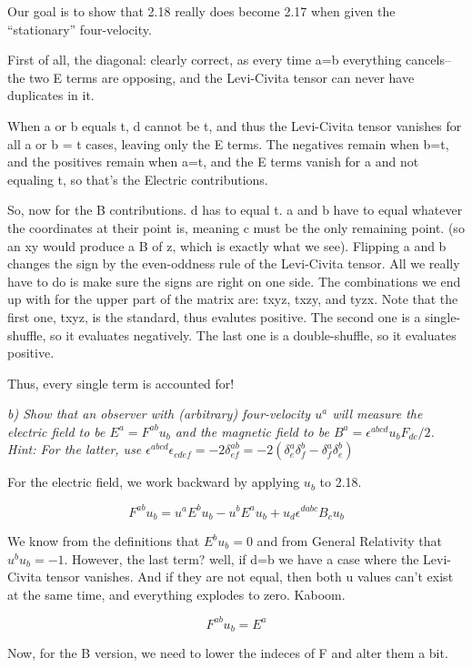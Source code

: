 \documentclass[landscape,letterpaper,10pt,english]{article}
\begin{document}
Our goal is to show that 2.18 really does become 2.17 when given the
``stationary'' four-velocity.

    First of all, the diagonal: clearly correct, as every time a=b
everything cancels--the two E terms are opposing, and the Levi-Civita
tensor can never have duplicates in it.

When a or b equals t, d cannot be t, and thus the Levi-Civita tensor
vanishes for all a or b = t cases, leaving only the E terms. The
negatives remain when b=t, and the positives remain when a=t, and the E
terms vanish for a and not equaling t, so that's the Electric
contributions.

So, now for the B contributions. d has to equal t. a and b have to equal
whatever the coordinates at their point is, meaning c must be the only
remaining point. (so an xy would produce a B of z, which is exactly what
we see). Flipping a and b changes the sign by the even-oddness rule of
the Levi-Civita tensor. All we really have to do is make sure the signs
are right on one side. The combinations we end up with for the upper
part of the matrix are: txyz, txzy, and tyzx. Note that the first one,
txyz, is the standard, thus evalutes positive. The second one is a
single-shuffle, so it evaluates negatively. The last one is a
double-shuffle, so it evaluates positive.

Thus, every single term is accounted for!

    \emph{b) Show that an observer with (arbitrary) four-velocity \(u^a\)
will measure the electric field to be \(E^a = F^{ab}u_b\) and the
magnetic field to be \(B^a = \epsilon^{abcd}u_b F_{dc}/2\). Hint: For
the latter, use
\(\epsilon^{abcd}\epsilon_{cdef} = -2\delta^{ab}_{ef} = -2(\delta^a_e\delta^b_f - \delta^a_f \delta^b_e)\)}

    For the electric field, we work backward by applying \(u_b\) to 2.18.

\[ F^{ab}u_b = u^aE^bu_b - u^bE^au_b + u_d\epsilon^{dabc} B_cu_b \]

We know from the definitions that \(E^bu_b=0\) and from General
Relativity that \(u^bu_b=-1\). However, the last term? well, if d=b we
have a case where the Levi-Civita tensor vanishes. And if they are not
equal, then both u values can't exist at the same time, and everything
explodes to zero. Kaboom.

\[ F^{ab}u_b = E^a \]

    Now, for the B version, we need to lower the indeces of F and alter them
a bit.
\end{document}
